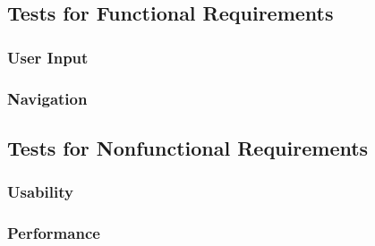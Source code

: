 \documentclass[12pt,fleqn]{article}
\begin{document}
\subsection{Tests for Functional Requirements}
\subsubsection{User Input}
\subsubsection{Navigation}

\subsection{Tests for Nonfunctional Requirements}
\subsubsection{Usability}
\subsubsection{Performance}
\end{document}
